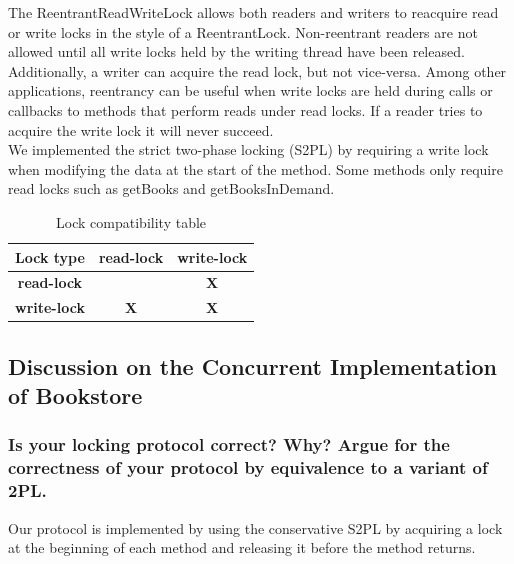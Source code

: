 \documentclass{article}      %
\begin{document}
The ReentrantReadWriteLock allows both readers and writers to reacquire read or write locks in the style of a ReentrantLock. Non-reentrant readers are not allowed until all write locks held by the writing thread have been released. Additionally, a writer can acquire the read lock, but not vice-versa. Among other applications, reentrancy can be useful when write locks are held during calls or callbacks to methods that perform reads under read locks. If a reader tries to acquire the write lock it will never succeed.\\

We implemented the strict two-phase locking (S2PL) by requiring a write lock when modifying the data at the start of the method. Some methods only require read locks such as getBooks and getBooksInDemand.\\

\begin{table}[h]
\begin{center}
\begin{tabular}{|c|c|c|}
\hline
{\bf{Lock type}} & \bf{read-lock} & \bf{write-lock} \\ \hline
\bf{read-lock} & \multicolumn{1}{l|}{} & \bf{X} \\ \hline
\bf{write-lock} & \bf{X} & \bf{X} \\ \hline
\end{tabular}
\caption{Lock compatibility table}
\label{Lock compatibility table}
\end{center}
\end{table}

\subsection*{Discussion on the Concurrent Implementation of Bookstore}

\subsubsection*{Is your locking protocol correct? Why? Argue for the correctness of your protocol by equivalence to a variant of 2PL.}

Our protocol is implemented by using the conservative S2PL by acquiring a lock at the beginning of each method and releasing it before the method returns.\\
\end{document}
